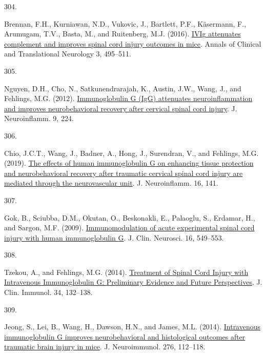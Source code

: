 \documentclass[
]{article}
\newlength{\cslhangindent}
\newlength{\csllabelwidth}
\newlength{\cslentryspacingunit} %
\newenvironment{CSLReferences}[2] %
 {%
  \setlength{\parindent}{0pt}
  \ifodd #1
  \let\oldpar\par
  \def\par{\hangindent=\cslhangindent\oldpar}
  \fi
  \setlength{\parskip}{#2\cslentryspacingunit}
 }%
 {}
\newcommand{\CSLLeftMargin}[1]{\parbox[t]{\csllabelwidth}{#1}}
\newcommand{\CSLRightInline}[1]{\parbox[t]{\linewidth - \csllabelwidth}{#1}\break}
\begin{document}
\begin{CSLReferences}{0}{0}
\leavevmode{}%
\CSLLeftMargin{304. }
\CSLRightInline{Brennan, F.H., Kurniawan, N.D., Vukovic, J., Bartlett, P.F., Käsermann, F., Arumugam, T.V., Basta, M., and Ruitenberg, M.J. (2016). \href{https://doi.org/10.1002/acn3.318}{{IVIg} attenuates complement and improves spinal cord injury outcomes in mice}. Annals of Clinical and Translational Neurology 3, 495--511.}

\leavevmode{}%
\CSLLeftMargin{305. }
\CSLRightInline{Nguyen, D.H., Cho, N., Satkunendrarajah, K., Austin, J.W., Wang, J., and Fehlings, M.G. (2012). \href{https://doi.org/10.1186/1742-2094-9-224}{Immunoglobulin {G} ({IgG}) attenuates neuroinflammation and improves neurobehavioral recovery after cervical spinal cord injury}. J. Neuroinflamm. 9, 224.}

\leavevmode{}%
\CSLLeftMargin{306. }
\CSLRightInline{Chio, J.C.T., Wang, J., Badner, A., Hong, J., Surendran, V., and Fehlings, M.G. (2019). \href{https://doi.org/10.1186/s12974-019-1518-0}{The effects of human immunoglobulin {G} on enhancing tissue protection and neurobehavioral recovery after traumatic cervical spinal cord injury are mediated through the neurovascular unit}. J. Neuroinflamm. 16, 141.}

\leavevmode{}%
\CSLLeftMargin{307. }
\CSLRightInline{Gok, B., Sciubba, D.M., Okutan, O., Beskonakli, E., Palaoglu, S., Erdamar, H., and Sargon, M.F. (2009). \href{https://doi.org/10.1016/j.jocn.2008.04.024}{Immunomodulation of acute experimental spinal cord injury with human immunoglobulin {G}}. J. Clin. Neurosci. 16, 549--553.}

\leavevmode{}%
\CSLLeftMargin{308. }
\CSLRightInline{Tzekou, A., and Fehlings, M.G. (2014). \href{https://doi.org/10.1007/s10875-014-0021-8}{Treatment of {Spinal Cord Injury} with {Intravenous Immunoglobulin G}: {Preliminary Evidence} and {Future Perspectives}}. J. Clin. Immunol. 34, 132--138.}

\leavevmode{}%
\CSLLeftMargin{309. }
\CSLRightInline{Jeong, S., Lei, B., Wang, H., Dawson, H.N., and James, M.L. (2014). \href{https://doi.org/10.1016/j.jneuroim.2014.08.626}{Intravenous immunoglobulin {G} improves neurobehavioral and histological outcomes after traumatic brain injury in mice}. J. Neuroimmunol. 276, 112--118.}


\end{CSLReferences}
\end{document}
